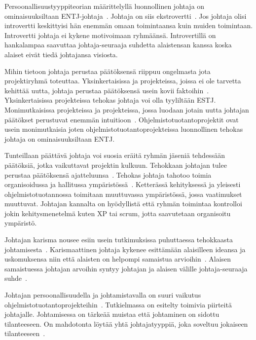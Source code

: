 \documentclass[finnish]{tktltiki2}
\theoremstyle{definition}
\theoremstyle{remark}
\begin{document}
Persoonallisuustyyppiteorian määrittelyllä luonnollinen johtaja on ominaisuuksiltaan ENTJ-johtaja~\cite{bradley1997effect}. Johtaja on siis ekstrovertti~\cite{bradley1997effect}. Jos johtaja olisi introvertti keskittyisi hän enemmän omaan toimintaansa kuin muiden toimintaan. Introvertti johtaja ei kykene motivoimaan ryhmäänsä. Introvertillä on hankalampaa saavuttaa johtaja-seuraaja suhdetta alaistensan kanssa koska alaiset eivät tiedä johtajansa visiosta.

Mihin tietoon johtaja perustaa päätöksensä riippuu ongelmasta jota projektiryhmä toteuttaa. Yksinkertaisissa ja projekteissa, joissa ei ole tarvetta kehittää uutta, johtaja perustaa päätöksensä usein kovii faktoihin~\cite{bradley1997effect}. Yksinkertaisissa projekteissa tehokas johtaja voi olla tyyliltään ESTJ. Monimutkaisissa projekteissa ja projekteissa, jossa luodaan jotain uutta johtajan päätökset perustuvat enemmän intuitioon~\cite{bradley1997effect}. Ohjelmistotuotantoprojektit ovat usein monimutkaisia joten ohjelmistotuotantoprojekteissa luonnollinen tehokas johtaja on ominaisuuksiltaan ENTJ.

Tunteillaan päättävä johtaja voi suosia eräitä ryhmän jäseniä tehdessään päätöksiä, jotka vaikuttavat projektin kulkuun. Tehokkaan johtajan tulee perustaa päätöksensä ajatteluunsa~\cite{bradley1997effect}. Tehokas johtaja tahotoo toimia organisoidussa ja hallitussa ympäristössä~\cite{bradley1997effect}. Ketterässä kehityksessä ja yleisesti ohjelmistotuotannossa toimitaan muuttuvassa ympäristössä, jossa vaatimukset muuttuvat. Johtajan kannalta on hyödyllistä että ryhmän toimintaa kontrolloi jokin kehitysmenetelmä kuten XP tai scrum, jotta saavutetaan organisoitu ympäristö.

Johtajan karisma nousee esiin usein tutkimuksissa puhuttaessa tehokkaasta johtamisesta~\cite{Dhomne:2012:ITL:2382887.2382899, thite2000leadership}. Karismaattinen johtaja kykenee esittämään alaisilleen ideansa ja uskomuksensa niin että alaisten on helpompi samaistua arvioihin~\cite{thite2000leadership}. Alaisen samaistuessa johtajan arvoihin syntyy johtajan ja alaisen välille johtaja-seuraaja suhde~\cite{raccoon2006leadership}.

Johtajan persoonallisuudella ja johtamistavalla on suuri vaikutus ohjelmistotuotantoprojekteihin~\cite{Wang:2009:PMP:1639950.1640049}. Tutkielmassa on esitelty toimivia piirteitä johtajalle. Johtamisessa on tärkeää muistaa että johtaminen on sidottu tilanteeseen. On mahdotonta löytää yhtä johtajatyyppiä, joka soveltuu jokaiseen tilanteeseen~\cite{thite2000leadership}.
\end{document}
